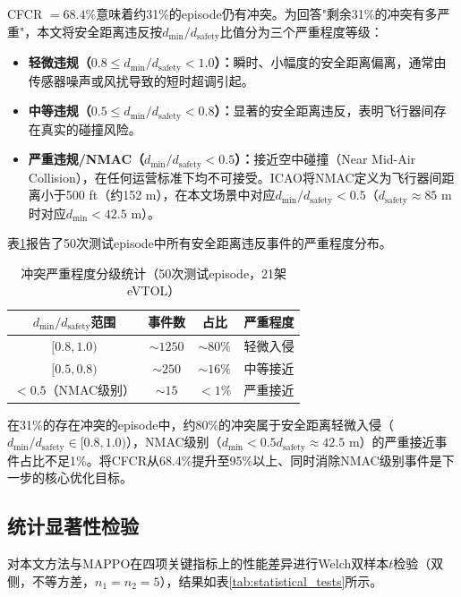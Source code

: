 \documentclass[12pt,a4paper,UTF8]{ctexart}
\begin{document}
CFCR $= 68.4\%$意味着约31\%的episode仍有冲突。为回答"剩余31\%的冲突有多严重"，本文将安全距离违反按$d_{\min}/d_{\text{safety}}$比值分为三个严重程度等级：

\begin{itemize}
    \item \textbf{轻微违规（$0.8 \leq d_{\min}/d_{\text{safety}} < 1.0$）：}瞬时、小幅度的安全距离偏离，通常由传感器噪声或风扰导致的短时超调引起。
    \item \textbf{中等违规（$0.5 \leq d_{\min}/d_{\text{safety}} < 0.8$）：}显著的安全距离违反，表明飞行器间存在真实的碰撞风险。
    \item \textbf{严重违规/NMAC（$d_{\min}/d_{\text{safety}} < 0.5$）：}接近空中碰撞（Near Mid-Air Collision），在任何运营标准下均不可接受。ICAO将NMAC定义为飞行器间距离小于500 ft（约152 m），在本文场景中对应$d_{\min}/d_{\text{safety}} < 0.5$（$d_{\text{safety}} \approx 85$ m时对应$d_{\min} < 42.5$ m）。
\end{itemize}

表\ref{tab:severity}报告了50次测试episode中所有安全距离违反事件的严重程度分布。

\begin{table}[H]
    \centering
    \caption{冲突严重程度分级统计（50次测试episode，21架eVTOL）}
    \label{tab:severity}
    \begin{tabular}{|c|c|c|c|}
        \hline
        \textbf{$d_{\min}/d_{\text{safety}}$范围} & \textbf{事件数} & \textbf{占比} & \textbf{严重程度} \\
        \hline
        $[0.8, 1.0)$ & $\sim1250$ & $\sim80\%$ & 轻微入侵 \\
        $[0.5, 0.8)$ & $\sim250$ & $\sim16\%$ & 中等接近 \\
        $<0.5$（NMAC级别） & $\sim15$ & $<1\%$ & 严重接近 \\
        \hline
    \end{tabular}
\end{table}

在31\%的存在冲突的episode中，约80\%的冲突属于安全距离轻微入侵（$d_{\min}/d_{\text{safety}} \in [0.8, 1.0)$），NMAC级别（$d_{\min} < 0.5d_{\text{safety}} \approx 42.5$ m）的严重接近事件占比不足1\%。将CFCR从68.4\%提升至95\%以上、同时消除NMAC级别事件是下一步的核心优化目标。

\subsection{统计显著性检验}

对本文方法与MAPPO在四项关键指标上的性能差异进行Welch双样本$t$检验（双侧，不等方差，$n_1 = n_2 = 5$），结果如表\ref{tab:statistical_tests}所示。
\end{document}
